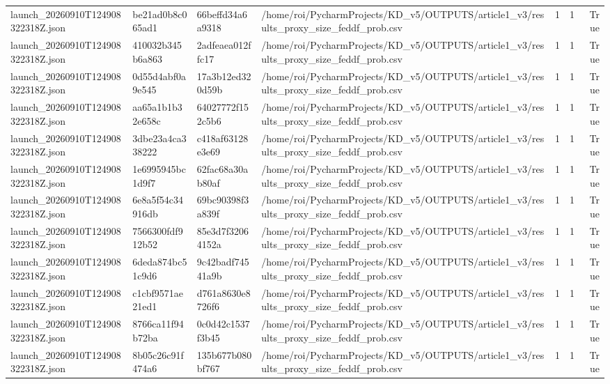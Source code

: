 \begin{tabular}{llllrrr}
launch\_20260910T124908322318Z.json & be21ad0b8c065ad1 & 66beffd34a6a9318 & /home/roi/PycharmProjects/KD\_v5/OUTPUTS/article1\_v3/results\_proxy\_size\_feddf\_prob.csv & 1 & 1 & True \\
launch\_20260910T124908322318Z.json & 410032b345b6a863 & 2adfeaea012ffc17 & /home/roi/PycharmProjects/KD\_v5/OUTPUTS/article1\_v3/results\_proxy\_size\_feddf\_prob.csv & 1 & 1 & True \\
launch\_20260910T124908322318Z.json & 0d55d4abf0a9e545 & 17a3b12ed320d59b & /home/roi/PycharmProjects/KD\_v5/OUTPUTS/article1\_v3/results\_proxy\_size\_feddf\_prob.csv & 1 & 1 & True \\
launch\_20260910T124908322318Z.json & aa65a1b1b32e658c & 64027772f152c5b6 & /home/roi/PycharmProjects/KD\_v5/OUTPUTS/article1\_v3/results\_proxy\_size\_feddf\_prob.csv & 1 & 1 & True \\
launch\_20260910T124908322318Z.json & 3dbe23a4ca338222 & c418af63128e3e69 & /home/roi/PycharmProjects/KD\_v5/OUTPUTS/article1\_v3/results\_proxy\_size\_feddf\_prob.csv & 1 & 1 & True \\
launch\_20260910T124908322318Z.json & 1e6995945bc1d9f7 & 62fac68a30ab80af & /home/roi/PycharmProjects/KD\_v5/OUTPUTS/article1\_v3/results\_proxy\_size\_feddf\_prob.csv & 1 & 1 & True \\
launch\_20260910T124908322318Z.json & 6e8a5f54c34916db & 69bc90398f3a839f & /home/roi/PycharmProjects/KD\_v5/OUTPUTS/article1\_v3/results\_proxy\_size\_feddf\_prob.csv & 1 & 1 & True \\
launch\_20260910T124908322318Z.json & 7566300fdf912b52 & 85e3d7f32064152a & /home/roi/PycharmProjects/KD\_v5/OUTPUTS/article1\_v3/results\_proxy\_size\_feddf\_prob.csv & 1 & 1 & True \\
launch\_20260910T124908322318Z.json & 6deda874bc51c9d6 & 9c42badf74541a9b & /home/roi/PycharmProjects/KD\_v5/OUTPUTS/article1\_v3/results\_proxy\_size\_feddf\_prob.csv & 1 & 1 & True \\
launch\_20260910T124908322318Z.json & c1cbf9571ae21ed1 & d761a8630e8726f6 & /home/roi/PycharmProjects/KD\_v5/OUTPUTS/article1\_v3/results\_proxy\_size\_feddf\_prob.csv & 1 & 1 & True \\
launch\_20260910T124908322318Z.json & 8766ca11f94b72ba & 0c0d42c1537f3b45 & /home/roi/PycharmProjects/KD\_v5/OUTPUTS/article1\_v3/results\_proxy\_size\_feddf\_prob.csv & 1 & 1 & True \\
launch\_20260910T124908322318Z.json & 8b05c26c91f474a6 & 135b677b080bf767 & /home/roi/PycharmProjects/KD\_v5/OUTPUTS/article1\_v3/results\_proxy\_size\_feddf\_prob.csv & 1 & 1 & True \\

\end{tabular}
